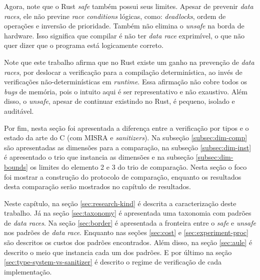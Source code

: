 Agora, note que o Rust \textit{safe} também possui seus limites. Apesar de prevenir \textit{data races}, ele não previne \textit{race conditions} lógicas, como: \textit{deadlocks}, ordem de operações e inversão de prioridade. Também não elimina o \textit{unsafe} na borda de hardware. Isso significa que compilar é não ter \textit{data race} exprimível, o que não quer dizer que o programa está logicamente correto.

Note que este trabalho afirma que no Rust existe um ganho na prevenção de \textit{data races}, por deslocar a verificação para a compilação determinística, ao invés de verificações não-determinísticas em \textit{runtime}. Essa afirmação não cobre todos os \textit{bugs} de memória, pois o intuito aqui é ser representativo e não exaustivo. Além disso, o \textit{unsafe}, apesar de continuar existindo no Rust, é pequeno, isolado e auditável.

Por fim, nesta seção foi apresentada a diferença entre a verificação por tipos e o estado da arte do C (com \ac{MISRA} e \textit{sanitizers}). Na subseção \ref{subsec:dim-comp} são apresentadas as dimensões para a comparação, na subseção \ref{subsec:dim-inst} é apresentado o trio que instancia as dimensões e na subseção \ref{subsec:dim-bounds} os limites do elemento 2 e 3 do trio de comparação. Nesta seção o foco foi mostrar a construção do protocolo de comparação, enquanto os resultados desta comparação serão mostrados no capítulo de resultados.

Neste capítulo, na seção \ref{sec:research-kind} é descrita a caracterização deste trabalho. Já na seção \ref{sec:taxonomy} é apresentada uma taxonomia com padrões de \textit{data races}. Na seção \ref{sec:border} é apresentada a fronteira entre o \textit{safe} e \textit{unsafe} nos padrões de \textit{data race}. Enquanto nas seções \ref{sec:cost} e \ref{sec:experiment-proc} são descritos os custos dos padrões encontrados. Além disso, na seção \ref{sec:aule} é descrito o meio que instancia cada um dos padrões. E por último na seção \ref{sec:type-system-vs-sanitizer} é descrito o regime de verificação de cada implementação.
